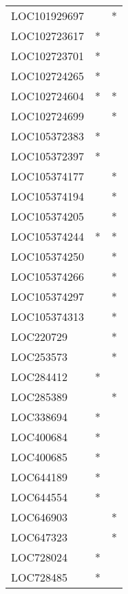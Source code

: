 \begin{longtable}{lcc}
LOC101929697     &                &          * \\
LOC102723617     &              * &            \\
LOC102723701     &              * &            \\
LOC102724265     &              * &            \\
LOC102724604     &              * &          * \\
LOC102724699     &                &          * \\
LOC105372383     &              * &            \\
LOC105372397     &              * &            \\
LOC105374177     &                &          * \\
LOC105374194     &                &          * \\
LOC105374205     &                &          * \\
LOC105374244     &              * &          * \\
LOC105374250     &                &          * \\
LOC105374266     &                &          * \\
LOC105374297     &                &          * \\
LOC105374313     &                &          * \\
LOC220729        &                &          * \\
LOC253573        &                &          * \\
LOC284412        &              * &            \\
LOC285389        &                &          * \\
LOC338694        &              * &            \\
LOC400684        &              * &            \\
LOC400685        &              * &            \\
LOC644189        &              * &            \\
LOC644554        &              * &            \\
LOC646903        &                &          * \\
LOC647323        &                &          * \\
LOC728024        &              * &            \\
LOC728485        &              * &            \\

\end{longtable}
